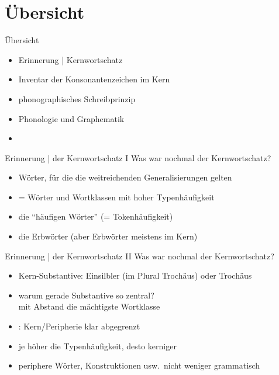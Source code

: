 \section{Übersicht}

\begin{frame}
  {Übersicht}
  \pause
  \begin{itemize}[<+->]
    \item Erinnerung | Kernwortschatz
      \Halbzeile
    \item Inventar der Konsonantenzeichen im Kern
      \Halbzeile
    \item phonographisches Schreibprinzip
      \Halbzeile
    \item Phonologie und Graphematik
      \Zeile
    \item \citet[Kapitel~15]{Schaefer2018b}
  \end{itemize}
\end{frame}

\begin{frame}
  {Erinnerung | der Kernwortschatz I}
  \pause
  Was war nochmal der Kernwortschatz?\\
  \Halbzeile
  \pause
  \begin{itemize}[<+->]
    \item Wörter, für die \alert{die weitreichenden Generalisierungen gelten}
    \item = Wörter und Wortklassen mit \alert{hoher Typenhäufigkeit}
    \item {} die "`häufigen Wörter"' (= Tokenhäufigkeit)
    \item {} die Erbwörter (aber Erbwörter meistens im Kern)
  \end{itemize}
\end{frame}

\begin{frame}
  {Erinnerung | der Kernwortschatz II}
  \pause
  Was war nochmal der Kernwortschatz?\\
  \Halbzeile
  \pause
  \begin{itemize}[<+->]
    \item Kern-Substantive: Einsilbler (im Plural Trochäus) oder Trochäus
    \item warum gerade Substantive so zentral?\\
      \alert{mit Abstand die mächtigste Wortklasse}
      \Halbzeile
    \item {}: Kern\slash Peripherie klar abgegrenzt
    \item je höher die Typenhäufigkeit, desto kerniger
    \item periphere Wörter, Konstruktionen usw.\ \alert{nicht weniger grammatisch}
  \end{itemize}
\end{frame}


